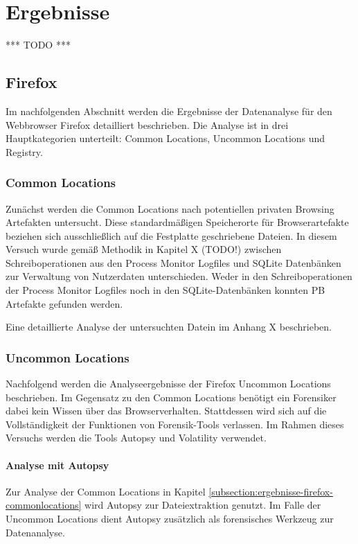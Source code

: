 \chapter{Ergebnisse}
\label{chapter:ergebnisse}
*** TODO ***

\section{Firefox}
\label{section:ergebnisse-firefox}
Im nachfolgenden Abschnitt werden die Ergebnisse der Datenanalyse für den Webbrowser Firefox detailliert beschrieben. Die Analyse ist in drei Hauptkategorien unterteilt: Common Locations, Uncommon Locations und Registry.

\subsection*{Common Locations}
\label{subsection:ergebnisse-firefox-commonlocations}
Zunächst werden die Common Locations nach potentiellen privaten Browsing Artefakten untersucht. Diese standardmäßigen Speicherorte für Browserartefakte beziehen sich ausschließlich auf die Festplatte geschriebene Dateien. In diesem Versuch wurde gemäß Methodik in Kapitel X (TODO!) zwischen Schreiboperationen aus den Process Monitor Logfiles und SQLite Datenbänken zur Verwaltung von Nutzerdaten unterschieden. Weder in den Schreiboperationen der Process Monitor Logfiles noch in den SQLite-Datenbänken konnten PB Artefakte gefunden werden. 

Eine detaillierte Analyse der untersuchten Datein im Anhang X beschrieben.

\subsection*{Uncommon Locations}
\label{subsection:ergebnisse-firefox-uncommonlocations}
Nachfolgend werden die Analyseergebnisse der Firefox Uncommon Locations beschrieben.
Im Gegensatz zu den Common Locations benötigt ein Forensiker dabei kein Wissen über das Browserverhalten. Stattdessen wird sich auf die Vollständigkeit der Funktionen von Forensik-Tools verlassen. Im Rahmen dieses Versuchs werden die Tools Autopsy und Volatility verwendet.

\subsubsection*{Analyse mit Autopsy}
\label{subsubsection:ergebnisse-firefox-uncommonlocations-analysemitautopsy}
Zur Analyse der Common Locations in Kapitel \ref{subsection:ergebnisse-firefox-commonlocations} wird Autopsy zur Dateiextraktion genutzt. Im Falle der Uncommon Locations dient Autopsy zusätzlich als forensisches Werkzeug zur Datenanalyse.

